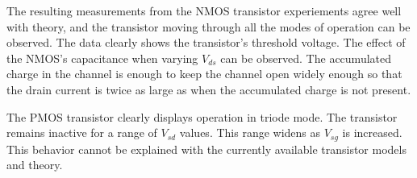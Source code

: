 The resulting measurements from the NMOS transistor experiements agree well with theory, and the transistor moving through all the modes of operation can be observed. The data clearly shows the transistor's threshold voltage. The effect of the NMOS's capacitance when varying $V_{ds}$ can be observed. The accumulated charge in the channel is enough to keep the channel open widely enough so that the drain current is twice as large as when the accumulated charge is not present. 
  
The PMOS transistor clearly displays operation in triode mode. The transistor remains inactive for a range of $V_{sd}$ values. This range widens as $V_{sg}$ is increased. This behavior cannot be explained with the currently available transistor models and theory.

